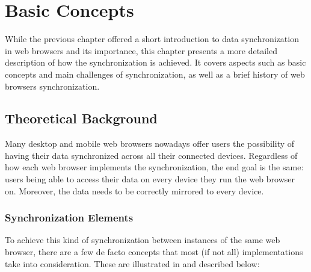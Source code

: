 \chapter{Basic Concepts}
\label{chapter:basic-concepts}

While the previous chapter offered a short introduction to data synchronization in web browsers and its importance, this chapter presents a more detailed description of how the synchronization is achieved. It covers aspects such as basic concepts and main challenges of synchronization, as well as a brief history of web browsers synchronization.

\section{Theoretical Background}
\label{sec:theoretical-background}

Many desktop and mobile web browsers nowadays offer users the possibility of having their data synchronized across all their connected devices. Regardless of how each web browser implements the synchronization, the end goal is the same: users being able to access their data on every device they run the web browser on. Moreover, the data needs to be correctly mirrored to every device.

\subsection{Synchronization Elements}
\label{sub-sec:sync-elements}

To achieve this kind of synchronization between instances of the same web browser, there are a few de facto concepts that most (if not all) implementations take into consideration. These are illustrated in  and described below:

